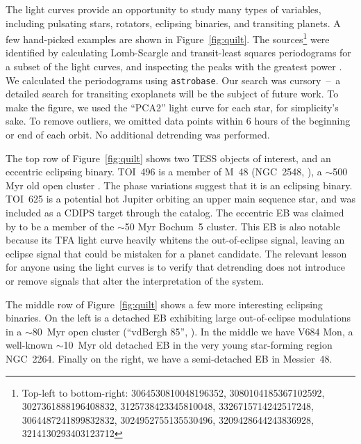 \documentclass[12pt,twocolumn,tighten]{aastex62}
\begin{document}
The light curves provide an opportunity to study many types of
variables, including pulsating stars, rotators, eclipsing binaries,
and transiting planets.  A few hand-picked examples are shown in
Figure~\ref{fig:quilt}.
The sources\footnote{
	Top-left to bottom-right:
	3064530810048196352, 
	3080104185367102592, 
	3027361888196408832,
	3125738423345810048,
	3326715714242517248,
	3064487241899832832,
	3024952755135530496,
  3209428644243836928,
  3214130293403123712 
} were identified by calculating Lomb-Scargle and transit-least
squares periodograms for a subset of the light curves, and inspecting
the peaks with the greatest power
\citep{lomb_1976,scargle_studies_1982,kovacs_box-fitting_2002,vanderplas_periodograms_2015,hippke_TLS_2019}.
We calculated the periodograms using \texttt{astrobase}.  Our search
was cursory~--~a detailed search for transiting exoplanets will be the
subject of future work.  To make the figure, we used the ``PCA2''
light curve for each star, for simplicity's sake.  To remove outliers,
we omitted data points within 6 hours of the beginning or end of each
orbit.  No additional detrending was performed.

The top row of Figure~\ref{fig:quilt} shows two TESS objects of
interest, and an eccentric eclipsing binary.  TOI~496 is a member of
M~48 (NGC~2548,
\citealt{gaia_collaboration_gaia_2018,cantat-gaudin_gaia_2018}), a
$\sim$500 Myr old open cluster \citep{Kharchenko_et_al_2013}.  The
phase variations suggest that it is an eclipsing binary.  TOI~625 is a
potential hot Jupiter orbiting an upper main sequence star, and was
included as a CDIPS target through the \citet{zari_3d_2018} catalog.
The eccentric EB was claimed by \citet{dias_proper_2014} to be a
member of the $\sim$50 Myr Bochum~5 cluster.  This EB is also notable
because its TFA light curve heavily whitens the out-of-eclipse signal,
leaving an eclipse signal that could be mistaken for a planet
candidate.  The relevant lesson for anyone using the light curves is
to verify that detrending does not introduce or remove signals that
alter the interpretation of the system.

The middle row of Figure~\ref{fig:quilt} shows a few more interesting
eclipsing binaries.  On the left is a detached EB exhibiting large
out-of-eclipse modulations in a $\sim$80~Myr open cluster (``vdBergh
85'', \citealt{Kharchenko_et_al_2013}).  In the middle we have V684
Mon, a well-known $\sim$10~Myr old detached EB in the very young
star-forming region NGC~2264.  Finally on the right, we have a
semi-detached EB in Messier~48.
\end{document}
